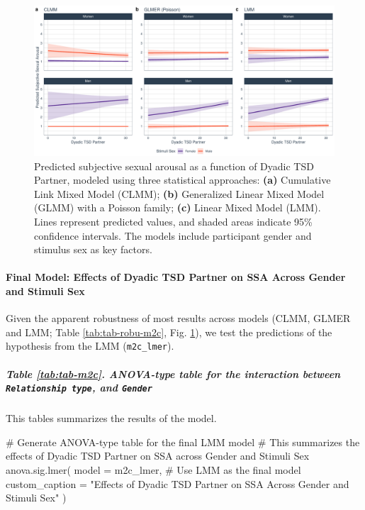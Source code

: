 \documentclass[
  bookmarksnumbered]{article}
\newenvironment{Shaded}{\begin{snugshade}}{\end{snugshade}}
\newcommand{\AttributeTok}[1]{\textcolor[rgb]{0.80,0.80,0.80}{#1}}
\newcommand{\CommentTok}[1]{\textcolor[rgb]{0.50,0.62,0.50}{#1}}
\newcommand{\FunctionTok}[1]{\textcolor[rgb]{0.94,0.94,0.56}{#1}}
\newcommand{\NormalTok}[1]{\textcolor[rgb]{0.80,0.80,0.80}{#1}}
\newcommand{\StringTok}[1]{\textcolor[rgb]{0.80,0.58,0.58}{#1}}
\begin{document}
\begin{figure}
\centering
\includegraphics{Sexual_Desire_Arousal_files/figure-latex/preds-m2c-1.pdf}
\caption{\label{fig:preds-m2c}Predicted subjective sexual arousal as a function of Dyadic TSD Partner, modeled using three statistical approaches: \textbf{(a)} Cumulative Link Mixed Model (CLMM); \textbf{(b)} Generalized Linear Mixed Model (GLMM) with a Poisson family; \textbf{(c)} Linear Mixed Model (LMM). Lines represent predicted values, and shaded areas indicate 95\% confidence intervals. The models include participant gender and stimulus sex as key factors.}
\end{figure}

\paragraph{Final Model: Effects of Dyadic TSD Partner on SSA Across Gender and Stimuli Sex}\label{final-model-effects-of-dyadic-tsd-partner-on-ssa-across-gender-and-stimuli-sex}

Given the apparent robustness of most results across models (CLMM, GLMER and LMM; Table \ref{tab:tab-robu-m2c}, Fig. \ref{fig:preds-m2c}), we test the predictions of the hypothesis from the LMM (\texttt{m2c\_lmer}).

\subparagraph{\texorpdfstring{Table \ref{tab:tab-m2c}. ANOVA-type table for the interaction between \texttt{Relationship\ type}, and \texttt{Gender}}{Table \ref{tab:tab-m2c}. ANOVA-type table for the interaction between Relationship type, and Gender}}\label{table-reftabtab-m2c.-anova-type-table-for-the-interaction-between-relationship-type-and-gender}

This tables summarizes the results of the model.

\begin{Shaded}
\begin{Highlighting}[]
\CommentTok{\# Generate ANOVA{-}type table for the final LMM model}
\CommentTok{\# This summarizes the effects of Dyadic TSD Partner on SSA across Gender and Stimuli Sex}
\FunctionTok{anova.sig.lmer}\NormalTok{(}
  \AttributeTok{model =}\NormalTok{ m2c\_lmer, }\CommentTok{\# Use LMM as the final model}
  \AttributeTok{custom\_caption =} \StringTok{"Effects of Dyadic TSD Partner on SSA Across Gender and Stimuli Sex"}
\NormalTok{)}
\end{Highlighting}
\end{Shaded}
\end{document}
